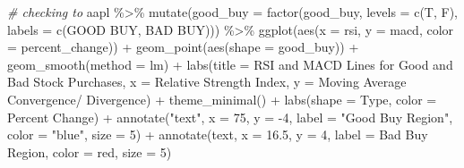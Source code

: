 \documentclass[
]{article}
\newenvironment{Shaded}{\begin{snugshade}}{\end{snugshade}}
\newcommand{\AttributeTok}[1]{\textcolor[rgb]{0.77,0.63,0.00}{#1}}
\newcommand{\CommentTok}[1]{\textcolor[rgb]{0.56,0.35,0.01}{\textit{#1}}}
\newcommand{\DecValTok}[1]{\textcolor[rgb]{0.00,0.00,0.81}{#1}}
\newcommand{\FloatTok}[1]{\textcolor[rgb]{0.00,0.00,0.81}{#1}}
\newcommand{\FunctionTok}[1]{\textcolor[rgb]{0.00,0.00,0.00}{#1}}
\newcommand{\NormalTok}[1]{#1}
\newcommand{\SpecialCharTok}[1]{\textcolor[rgb]{0.00,0.00,0.00}{#1}}
\newcommand{\StringTok}[1]{\textcolor[rgb]{0.31,0.60,0.02}{#1}}
\begin{document}
\begin{Shaded}
\begin{Highlighting}[]
\CommentTok{\# checking to }
\NormalTok{aapl }\SpecialCharTok{\%\textgreater{}\%}
  \FunctionTok{mutate}\NormalTok{(}\AttributeTok{good\_buy =} \FunctionTok{factor}\NormalTok{(good\_buy, }\AttributeTok{levels =} \FunctionTok{c}\NormalTok{(T, F), }\AttributeTok{labels =} \FunctionTok{c}\NormalTok{(}\StringTok{\textquotesingle{}GOOD BUY\textquotesingle{}}\NormalTok{, }\StringTok{\textquotesingle{}BAD BUY\textquotesingle{}}\NormalTok{))) }\SpecialCharTok{\%\textgreater{}\%}
  \FunctionTok{ggplot}\NormalTok{(}\FunctionTok{aes}\NormalTok{(}\AttributeTok{x =}\NormalTok{ rsi, }\AttributeTok{y =}\NormalTok{ macd, }\AttributeTok{color =}\NormalTok{ percent\_change)) }\SpecialCharTok{+} 
  \FunctionTok{geom\_point}\NormalTok{(}\FunctionTok{aes}\NormalTok{(}\AttributeTok{shape =}\NormalTok{ good\_buy)) }\SpecialCharTok{+}
  \FunctionTok{geom\_smooth}\NormalTok{(}\AttributeTok{method =} \StringTok{\textquotesingle{}lm\textquotesingle{}}\NormalTok{) }\SpecialCharTok{+} 
  \FunctionTok{labs}\NormalTok{(}\AttributeTok{title =} \StringTok{\textquotesingle{}RSI and MACD Lines for Good and Bad Stock Purchases\textquotesingle{}}\NormalTok{,}
       \AttributeTok{x =} \StringTok{\textquotesingle{}Relative Strength Index\textquotesingle{}}\NormalTok{,}
       \AttributeTok{y =} \StringTok{\textquotesingle{}Moving Average Convergence/ Divergence\textquotesingle{}}\NormalTok{) }\SpecialCharTok{+} 
  \FunctionTok{theme\_minimal}\NormalTok{() }\SpecialCharTok{+} 
  \FunctionTok{labs}\NormalTok{(}\AttributeTok{shape =} \StringTok{\textquotesingle{}Type\textquotesingle{}}\NormalTok{,}
       \AttributeTok{color =} \StringTok{\textquotesingle{}Percent Change\textquotesingle{}}\NormalTok{) }\SpecialCharTok{+}
  \FunctionTok{annotate}\NormalTok{(}\StringTok{"text"}\NormalTok{, }\AttributeTok{x =} \DecValTok{75}\NormalTok{, }\AttributeTok{y =} \SpecialCharTok{{-}}\DecValTok{4}\NormalTok{, }\AttributeTok{label =} \StringTok{"Good Buy Region"}\NormalTok{, }\AttributeTok{color =} \StringTok{"blue"}\NormalTok{, }\AttributeTok{size =} \DecValTok{5}\NormalTok{) }\SpecialCharTok{+}
  \FunctionTok{annotate}\NormalTok{(}\StringTok{\textquotesingle{}text\textquotesingle{}}\NormalTok{, }\AttributeTok{x =} \FloatTok{16.5}\NormalTok{, }\AttributeTok{y =} \DecValTok{4}\NormalTok{, }\AttributeTok{label =} \StringTok{\textquotesingle{}Bad Buy Region\textquotesingle{}}\NormalTok{, }\AttributeTok{color =} \StringTok{\textquotesingle{}red\textquotesingle{}}\NormalTok{, }\AttributeTok{size =} \DecValTok{5}\NormalTok{)}
\end{Highlighting}
\end{Shaded}
\end{document}
